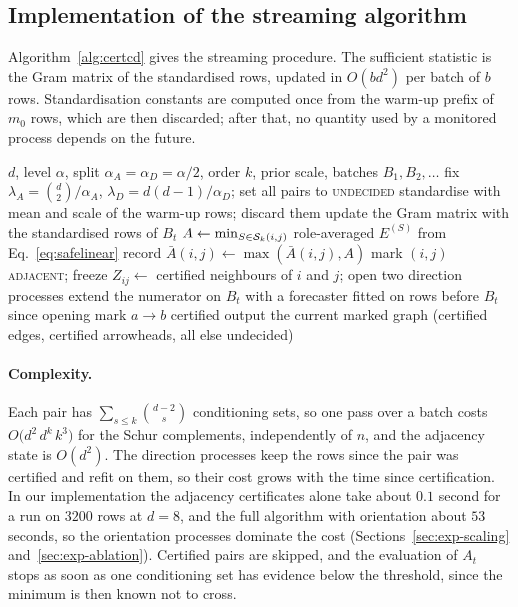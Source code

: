 \subsection{Implementation of the streaming algorithm}\label{sec:implementation}

Algorithm~\ref{alg:certcd} gives the streaming procedure. The sufficient
statistic is the Gram matrix of the standardised rows, updated in $O(bd^2)$ per
batch of $b$ rows. Standardisation constants are computed once from the
warm-up prefix of $m_0$ rows, which are then discarded; after that, no quantity
used by a monitored process depends on the future.

\begin{algorithm}[t]
\caption{CERT-CD (streaming)}\label{alg:certcd}
\begin{algorithmic}[1]
\Require $d$, level $\alpha$, split $\alpha_A=\alpha_D=\alpha/2$, order $k$, prior scale, batches $B_1,B_2,\dots$
\State fix $\lambda_A=\binom d2/\alpha_A$, $\lambda_D=d(d-1)/\alpha_D$; set all pairs to \textsc{undecided}
\State standardise with mean and scale of the warm-up rows; discard them
  \State update the Gram matrix with the standardised rows of $B_t$
    \State $A\gets\min_{S\in\mathcal{S}_k(i,j)}$ role-averaged $E^{(S)}$ from Eq.~\eqref{eq:safelinear}
    \State record $\bar A(i,j)\gets\max(\bar A(i,j),A)$
     mark $(i,j)$ \textsc{adjacent}; freeze $Z_{ij}\gets$ certified neighbours of $i$ and $j$; open two direction processes \EndIf
  \EndFor
    \State extend the numerator on $B_t$ with a forecaster fitted on rows before $B_t$ since opening
     mark $a\to b$ certified \EndIf
  \EndFor
  \State output the current marked graph (certified edges, certified arrowheads, all else undecided)
\EndFor
\end{algorithmic}
\end{algorithm}

\paragraph{Complexity.} Each pair has $\sum_{s\le k}\binom{d-2}{s}$ conditioning
sets, so one pass over a batch costs $O\bigl(d^2\,d^{k}\,k^3\bigr)$ for the
Schur complements, independently of $n$, and the adjacency state is $O(d^2)$.
The direction processes keep the rows since the pair was certified and refit on
them, so their cost grows with the time since certification. In our
implementation the adjacency certificates alone take about $0.1$ second for a run
on $3200$ rows at $d=8$, and the full algorithm with orientation about $53$
seconds, so the orientation processes dominate the cost
(Sections~\ref{sec:exp-scaling} and~\ref{sec:exp-ablation}). Certified pairs are skipped, and the evaluation of $A_t$ stops
as soon as one conditioning set has evidence below the threshold, since the
minimum is then known not to cross.

